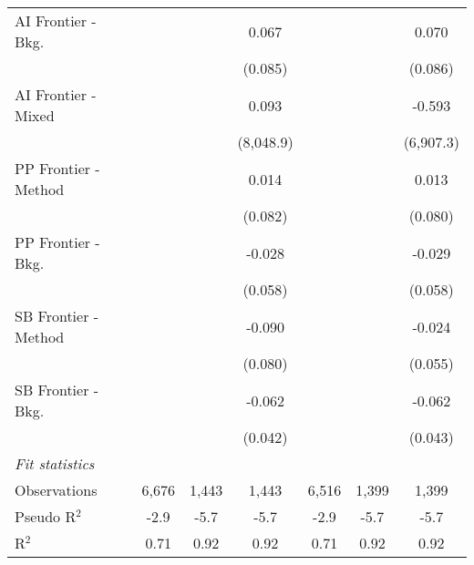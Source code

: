 \begin{tabular}{lcccccc}
   AI Frontier - Bkg.   &               &               & 0.067         &               &               & 0.070\\   
                        &               &               & (0.085)       &               &               & (0.086)\\   
   AI Frontier - Mixed  &               &               & 0.093         &               &               & -0.593\\   
                        &               &               & (8,048.9)     &               &               & (6,907.3)\\   
   PP Frontier - Method &               &               & 0.014         &               &               & 0.013\\   
                        &               &               & (0.082)       &               &               & (0.080)\\   
   PP Frontier - Bkg.   &               &               & -0.028        &               &               & -0.029\\   
                        &               &               & (0.058)       &               &               & (0.058)\\   
   SB Frontier - Method &               &               & -0.090        &               &               & -0.024\\   
                        &               &               & (0.080)       &               &               & (0.055)\\   
   SB Frontier - Bkg.   &               &               & -0.062        &               &               & -0.062\\   
                        &               &               & (0.042)       &               &               & (0.043)\\   
   \midrule
   \emph{Fit statistics}\\
   Observations         & 6,676         & 1,443         & 1,443         & 6,516         & 1,399         & 1,399\\  
   Pseudo R$^2$         & -2.9          & -5.7          & -5.7          & -2.9          & -5.7          & -5.7\\  
   R$^2$                & 0.71          & 0.92          & 0.92          & 0.71          & 0.92          & 0.92\\  
   

\end{tabular}
